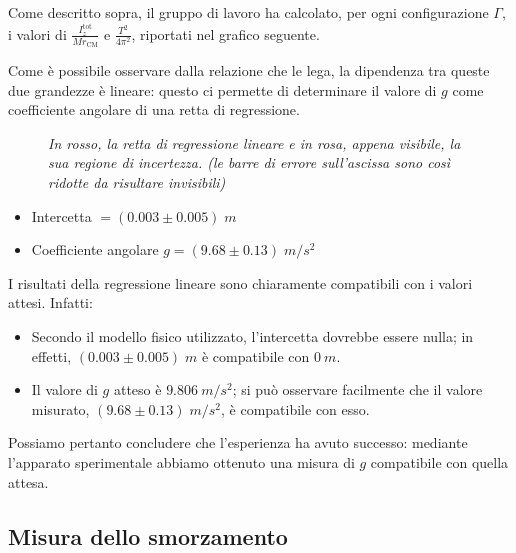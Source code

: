 \documentclass{article}
\begin{document}
\vspace{2mm}

Come descritto sopra, il gruppo di lavoro ha calcolato, per ogni
configurazione $\Gamma$,
i valori di $\frac{I_z^\text{tot}}{Mr_\text{CM}}$
e $\frac{T^2}{4\pi^2}$, riportati nel grafico seguente.

Come è possibile osservare dalla relazione che le lega, la dipendenza
tra queste due grandezze è lineare: questo ci permette di determinare
il valore di $g$ come coefficiente angolare di una retta di regressione.

\begin{center}
\begin{figure}[H]
  \caption[]{\emph{
    In rosso, la retta di regressione lineare e in rosa,
    appena visibile, la sua regione di incertezza.
    (le barre di errore sull'ascissa sono così ridotte
    da risultare invisibili)
  }}
\end{figure}
\end{center}

\begin{itemize}
  \item Intercetta $= (0.003 \pm 0.005)\;\unit{m}$
  \item Coefficiente angolare $g = (9.68 \pm 0.13)\;\unit{m\per s^2}$
\end{itemize}
\pagebreak
I risultati della regressione lineare sono chiaramente compatibili
con i valori attesi. Infatti:
\begin{itemize}
  \item Secondo il modello fisico utilizzato, l'intercetta dovrebbe
  essere nulla; in effetti, $(0.003\pm0.005)\;\unit{m}$ è compatibile
  con $\qty{0}{m}$.
  \item Il valore di $g$ atteso è $\qty{9.806}{m\per s^2}$; si può
  osservare facilmente che il valore misurato,
  $(9.68\pm0.13)\;\unit{m \per s^2}$, è compatibile con esso.
\end{itemize}

Possiamo pertanto concludere che l'esperienza ha avuto successo:
mediante l'apparato sperimentale abbiamo ottenuto una misura di $g$
compatibile con quella attesa.

\pagebreak
\subsection{Misura dello smorzamento}
\end{document}
